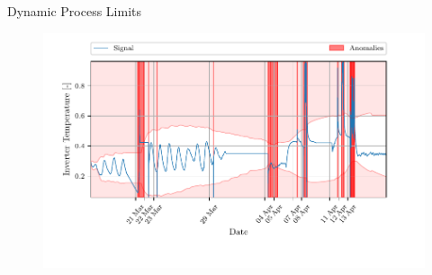 \documentclass[aspectratio=169]{beamer}
\begin{document}
\begin{frame}{Dynamic Process Limits}
    \begin{figure}[htpb]
        \begin{center}
            \includegraphics[width=0.78\linewidth]{figures/Inverter_Temperature_sliding_thresh.pdf}
        \end{center}
    \end{figure}
\end{frame}
\end{document}
